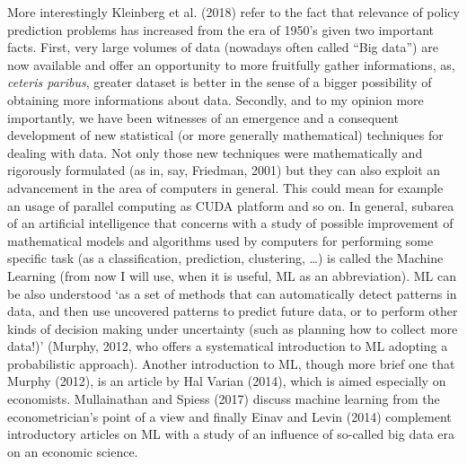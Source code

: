\documentclass[12pt, twoside]{book} %
\begin{document}
More interestingly Kleinberg et al. (2018) refer to the fact that relevance of policy prediction problems has increased from the era of 1950's given two important facts. First, very large volumes of data (nowadays often called “Big data”) are now available and offer an opportunity to more fruitfully gather informations, as, \textit{ceteris paribus}, greater dataset is better in the sense of a bigger possibility of obtaining more informations about data. Secondly, and to my opinion more importantly, we have been witnesses of an emergence and a consequent development of new statistical (or more generally mathematical) techniques for dealing with data. Not only those new techniques were mathematically and rigorously formulated (as in, say, Friedman, 2001) but they can also exploit an advancement in the area of computers in general. This could mean for example an usage of parallel computing as CUDA platform and so on. In general, subarea of an artificial intelligence that concerns with a study of possible improvement of mathematical models and algorithms used by computers for performing some specific task (as a classification, prediction, clustering, \ldots) is called the Machine Learning (from now I will use, when it is useful, ML as an abbreviation). ML can be also understood ‘as a set of methods that can automatically detect patterns in data, and then use uncovered patterns to predict future data, or to perform other kinds of decision making under uncertainty (such as planning how to collect more data!)’ (Murphy, 2012, who offers a systematical introduction to ML adopting a probabilistic approach). Another introduction to ML, though more brief one that Murphy (2012), is an article by Hal Varian (2014), which is aimed especially on economists. Mullainathan and Spiess (2017) discuss machine learning from the econometrician's point of a view and finally Einav and Levin (2014) complement introductory articles on ML with a study of an influence of so-called big data era on an economic science. \newline
\end{document}
